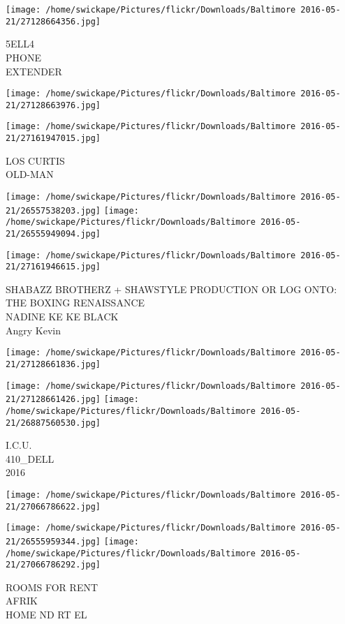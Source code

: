 \documentclass[10pt,letterpaper]{article}
\begin{document}
\texttt{[image: /home/swickape/Pictures/flickr/Downloads/Baltimore 2016-05-21/27128664356.jpg]}

5ELL4\\
PHONE\\
EXTENDER
\pagebreak

\texttt{[image: /home/swickape/Pictures/flickr/Downloads/Baltimore 2016-05-21/27128663976.jpg]}

\vspace{0.25in}
\texttt{[image: /home/swickape/Pictures/flickr/Downloads/Baltimore 2016-05-21/27161947015.jpg]}

LOS CURTIS\\
OLD{-}MAN
\pagebreak

\texttt{[image: /home/swickape/Pictures/flickr/Downloads/Baltimore 2016-05-21/26557538203.jpg]}
\texttt{[image: /home/swickape/Pictures/flickr/Downloads/Baltimore 2016-05-21/26555949094.jpg]}

\texttt{[image: /home/swickape/Pictures/flickr/Downloads/Baltimore 2016-05-21/27161946615.jpg]}

SHABAZZ BROTHERZ + SHAWSTYLE PRODUCTION OR LOG ONTO: THE BOXING RENAISSANCE\\
NADINE KE KE BLACK\\
Angry Kevin
\pagebreak

\texttt{[image: /home/swickape/Pictures/flickr/Downloads/Baltimore 2016-05-21/27128661836.jpg]}

\vspace{0.25in}
\texttt{[image: /home/swickape/Pictures/flickr/Downloads/Baltimore 2016-05-21/27128661426.jpg]}
\texttt{[image: /home/swickape/Pictures/flickr/Downloads/Baltimore 2016-05-21/26887560530.jpg]}

I.C.U.\\
410\_DELL\\
2016
\pagebreak

\texttt{[image: /home/swickape/Pictures/flickr/Downloads/Baltimore 2016-05-21/27066786622.jpg]}

\vspace{0.25in}
\texttt{[image: /home/swickape/Pictures/flickr/Downloads/Baltimore 2016-05-21/26555959344.jpg]}
\texttt{[image: /home/swickape/Pictures/flickr/Downloads/Baltimore 2016-05-21/27066786292.jpg]}

ROOMS FOR RENT\\
AFRIK\\
HOME ND RT EL
\pagebreak
\end{document}
